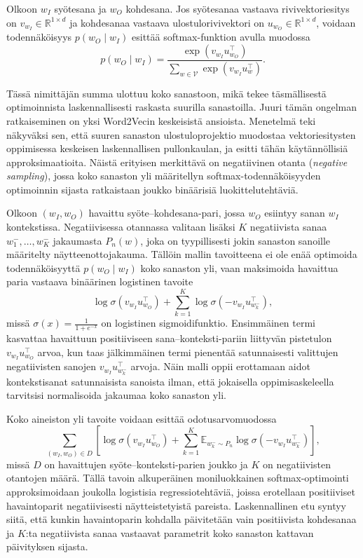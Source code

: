 Olkoon \(w_I\) syötesana ja \(w_O\) kohdesana. Jos syötesanaa vastaava
rivivektoriesitys on \(v_{w_I} \in \mathbb{R}^{1 \times d}\) ja kohdesanaa
vastaava ulostulorivivektori on \(u_{w_O} \in \mathbb{R}^{1 \times d}\),
voidaan todennäköisyys \(p(w_O \mid w_I)\) esittää softmax-funktion avulla
muodossa
$$
p(w_O \mid w_I)
=
\frac{\exp(v_{w_I} u_{w_O}^{\top})}
{\sum_{w \in \mathcal{V}} \exp(v_{w_I} u_w^{\top})}.
$$

Tässä nimittäjän summa ulottuu koko sanastoon, mikä tekee täsmällisestä
optimoinnista laskennallisesti raskasta suurilla sanastoilla. Juuri tämän
ongelman ratkaiseminen on yksi Word2Vecin keskeisistä ansioista. Menetelmä teki
näkyväksi sen, että suuren sanaston ulostuloprojektio muodostaa
vektoriesitysten oppimisessa keskeisen laskennallisen pullonkaulan, ja esitti
tähän käytännöllisiä approksimaatioita. Näistä erityisen merkittävä on
negatiivinen otanta (\emph{negative sampling}), jossa koko sanaston yli
määritellyn softmax-todennäköisyyden optimoinnin sijasta ratkaistaan joukko
binäärisiä luokittelutehtäviä.

Olkoon \((w_I, w_O)\) havaittu syöte--kohdesana-pari, jossa \(w_O\) esiintyy
sanan \(w_I\) kontekstissa. Negatiivisessa otannassa valitaan lisäksi
\(K\) negatiivista sanaa \(w_1^{-}, \dots, w_K^{-}\) jakaumasta
\(P_n(w)\), joka on tyypillisesti jokin sanaston sanoille määritelty
näytteenottojakauma. Tällöin mallin tavoitteena ei ole enää optimoida
todennäköisyyttä \(p(w_O \mid w_I)\) koko sanaston yli, vaan maksimoida
havaittua paria vastaava binäärinen logistinen tavoite
$$
\log \sigma\!\left(v_{w_I} u_{w_O}^{\top}\right)
+
\sum_{k=1}^{K}
\log \sigma\!\left(-v_{w_I} u_{w_k^{-}}^{\top}\right),
$$
missä \(\sigma(x) = \frac{1}{1 + e^{-x}}\) on logistinen sigmoidifunktio.
Ensimmäinen termi kasvattaa havaittuun positiiviseen sana--konteksti-pariin
liittyvän pistetulon \(v_{w_I} u_{w_O}^{\top}\) arvoa, kun taas jälkimmäinen
termi pienentää satunnaisesti valittujen negatiivisten sanojen
\(v_{w_I} u_{w_k^{-}}^{\top}\) arvoja. Näin malli oppii erottamaan aidot
kontekstisanat satunnaisista sanoista ilman, että jokaisella oppimisaskeleella
tarvitsisi normalisoida jakaumaa koko sanaston yli.

Koko aineiston yli tavoite voidaan esittää odotusarvomuodossa
$$
\sum_{(w_I, w_O) \in D}
\left[
  \log \sigma\!\left(v_{w_I} u_{w_O}^{\top}\right)
  +
  \sum_{k=1}^{K}
  \mathbb{E}_{w_k^{-} \sim P_n}
  \log \sigma\!\left(-v_{w_I} u_{w_k^{-}}^{\top}\right)
\right],
$$
missä \(D\) on havaittujen syöte--konteksti-parien joukko ja \(K\) on negatiivisten otantojen määrä. Tällä tavoin
alkuperäinen moniluokkainen softmax-optimointi approksimoidaan joukolla
logistisia regressiotehtäviä, joissa erotellaan positiiviset havaintoparit
negatiivisesti näytteistetyistä pareista. Laskennallinen etu syntyy siitä, että
kunkin havaintoparin kohdalla päivitetään vain positiivista kohdesanaa ja
\(K\):ta negatiivista sanaa vastaavat parametrit koko sanaston kattavan
päivityksen sijasta.

